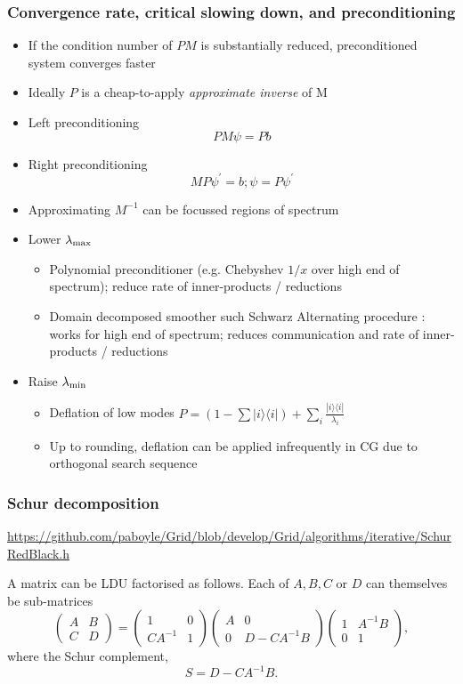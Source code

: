 \documentclass[pdf,ps,8pt]{beamer}
\newcommand{\link}[1]{\href{#1}{ {\color{blue} #1} }}
\begin{document}
\begin{frame}[fragile]\small\frametitle{ Convergence rate, critical slowing down, and preconditioning}
\begin{itemize}
\item If the condition number of $P M$ is substantially reduced, preconditioned system converges faster
\item Ideally $P$ is a cheap-to-apply \emph{approximate inverse} of M
\item Left preconditioning
$$
P M \psi = P b
$$
\item Right preconditioning 
$$
M P \psi^\prime = b ; \psi = P \psi^\prime
$$
\item Approximating $M^{-1}$ can be focussed regions of spectrum
\item Lower $\lambda_{\rm max}$
\begin{itemize}
\item Polynomial preconditioner (e.g. Chebyshev $1/x$ over high end of spectrum); reduce rate of inner-products / reductions
\item Domain decomposed smoother such Schwarz Alternating procedure : works for high end of spectrum; reduces communication and rate of inner-products / reductions
\end{itemize}
\item Raise $\lambda_{\rm min}$
\begin{itemize}
\item Deflation of low modes $P = (1 - \sum |i\rangle\langle i|) + \sum_i  \frac{|i\rangle\langle i|}{\lambda_i}  $
\item Up to rounding, deflation can be applied infrequently in CG due to orthogonal search sequence
\end{itemize}
\end{itemize}
\end{frame}


\begin{frame}[fragile]\small\frametitle{ Schur decomposition}

\link{https://github.com/paboyle/Grid/blob/develop/Grid/algorithms/iterative/SchurRedBlack.h}

A matrix can be LDU factorised as follows. Each of $A, B, C$ or $D$ can themselves be sub-matrices
\begin{equation}
\left(
\begin{array}{cc}
A & B \\
C & D
\end{array}
\right)
= 
\left(
\begin{array}{cc}
1  &   0 \\
C A^{-1}  & 1
\end{array}
\right)
\left(
\begin{array}{cc}
A & 0\\
0 & D - C A^{-1} B
\end{array}
\right)
\left(
\begin{array}{cc}
1 & A^{-1} B  \\
0 & 1
\end{array}
\right),
\end{equation}
where the Schur complement,
$$
S = D - C A^{-1} B.
$$

\end{frame}
\end{document}
